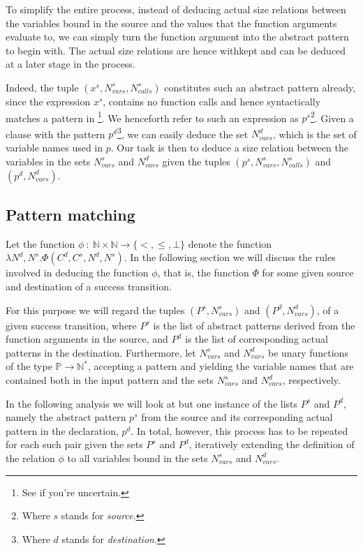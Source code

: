 To simplify the entire process, instead of deducing actual size relations
between the variables bound in the source and the values that the function
arguments evaluate to, we can simply turn the function argument into the
abstract pattern to begin with. The actual size relations are hence withkept
and can be deduced at a later stage in the process.

Indeed, the tuple $(x^s,N_{vars}^s,N_{calls}^s)$ constitutes such an abstract
pattern already, since the expression $x^s$, contains no function calls and
hence syntactically matches a pattern in \D{}\footnote{See
 if you're uncertain.}. We henceforth refer to such an
expression as $p^s$\footnote{Where $s$ stands for \emph{source}.}. Given a
clause with the pattern $p^d$\footnote{Where $d$ stands for
\emph{destination}.}, we can easily deduce the set $N_{vars}^d$, which is the
set of variable names used in $p$. Our task is then to deduce a size relation
between the variables in the sets $N_{vars}^s$ and $N_{vars}^d$ given the
tuples $(p^s,N_{vars}^s,N_{calls}^s)$ and $(p^d,N_{vars}^d)$.

\subsection{Pattern matching}

Let the function $\phi\ :\ \mathbb{N} \times \mathbb{N} \rightarrow
\{<,\leq,\bot\}$ denote the function $\lambda N^d, N^s .
\Phi\left(C^d,C^s,N^d,N^s\right)$. In the following section we will discuss the
rules involved in deducing the function $\phi$, that is, the function $\Phi$
for some given source and destination of a success transition.

For this purpose we will regard the tuples $(P^s,N_{vars}^s)$ and
$(P^d,N_{vars}^d)$, of a given success transition, where $P^s$ is the list of
abstract patterns derived from the function arguments in the source, and $P^d$
is the list of corresponding actual patterns in the destination. Furthermore,
let $N_{vars}^s$ and $N_{vars}^d$ be unary functions of the type
$\mathbb{P}\rightarrow\mathbb{N}^*$, accepting a pattern and yielding the
variable names that are contained both in the input pattern and the sets
$N_{vars}^s$ and $N_{vars}^d$, respectively.

In the following analysis we will look at but one instance of the lists $P^s$
and $P^d$, namely the abstract pattern $p^s$ from the source and its
corresponding actual pattern in the declaration, $p^d$. In total, however, this
process has to be repeated for each such pair given the sets $P^s$ and $P^d$,
iteratively extending the definition of the relation $\phi$ to all variables
bound in the sets $N_{vars}^s$ and $N_{vars}^d$.

